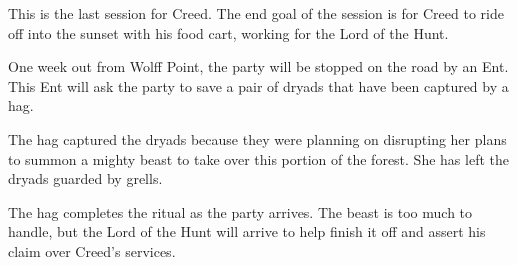 This is the last session for Creed.
The end goal of the session is for Creed to ride off into the sunset with his food cart, working for the Lord of the Hunt.

One week out from Wolff Point, the party will be stopped on the road by an Ent.
This Ent will ask the party to save a pair of dryads that have been captured by a hag.

The hag captured the dryads because they were planning on disrupting her plans to summon a mighty beast to take over this portion of the forest.
She has left the dryads guarded by grells.

The hag completes the ritual as the party arrives.
The beast is too much to handle, but the Lord of the Hunt will arrive to help finish it off and assert his claim over Creed's services.